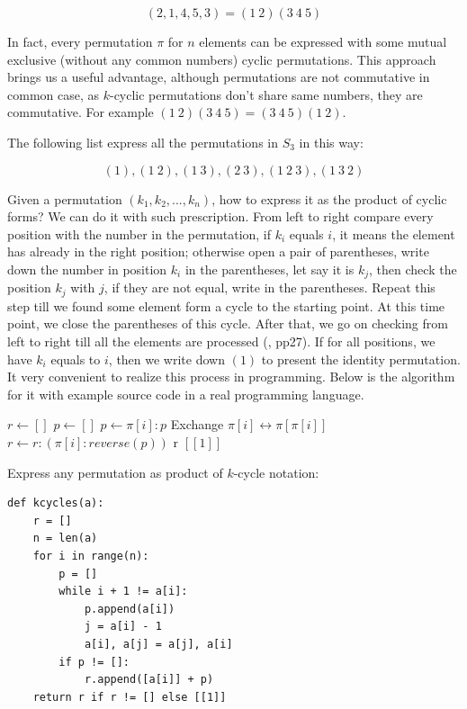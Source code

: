\documentclass{article}
\begin{document}
\[
(2, 1, 4, 5, 3) = (1\ 2)(3\ 4\ 5)
\]

In fact, every permutation $\pi$ for $n$ elements can be expressed with some mutual exclusive (without any common numbers) cyclic permutations. This approach brings us a useful advantage, although permutations are not commutative in common case, as $k$-cyclic permutations don't share same numbers, they are commutative. For example $(1\ 2)(3\ 4\ 5) = (3\ 4\ 5)(1\ 2)$.

The following list express all the permutations in $S_3$ in this way:

\[
(1),
(1\ 2), (1\ 3), (2\ 3),
(1\ 2\ 3), (1\ 3\ 2)
\]

Given a permutation $(k_1, k_2, ..., k_n)$, how to express it as the product of cyclic forms? We can do it with such prescription. From left to right compare every position with the number in the permutation, if $k_i$ equals $i$, it means the element has already in the right position; otherwise open a pair of parentheses, write down the number in position $k_i$ in the parentheses, let say it is $k_j$, then check the position $k_j$ with $j$, if they are not equal, write in the parentheses. Repeat this step till we found some element form a cycle to the starting point. At this time point, we close the parentheses of this cycle. After that, we go on checking from left to right till all the elements are processed (\cite{Armstrong1988}, pp27). If for all positions, we have $k_i$ equals to $i$, then we write down $(1)$ to present the identity permutation. It very convenient to realize this process in programming. Below is the algorithm for it with example source code in a real programming language.

\begin{algorithmic}
  \State $r \gets []$
    \State $p \gets []$
      \State $p \gets \pi[i]:p$
      \State Exchange $\pi[i] \leftrightarrow \pi[\pi[i]]$
    \EndWhile
      \State $r \gets r:(\pi[i]:reverse(p))$
    \EndIf
  \EndFor
    \State \Return r
  \Else
    \State \Return $[[1]]$ 
  \EndIf
\EndFunction
\end{algorithmic}

Express any permutation as product of $k$-cycle notation:

\lstset{language=Python}
\begin{lstlisting}
def kcycles(a):
    r = []
    n = len(a)
    for i in range(n):
        p = []
        while i + 1 != a[i]:
            p.append(a[i])
            j = a[i] - 1
            a[i], a[j] = a[j], a[i]
        if p != []:
            r.append([a[i]] + p)
    return r if r != [] else [[1]]
\end{lstlisting}
\end{document}
